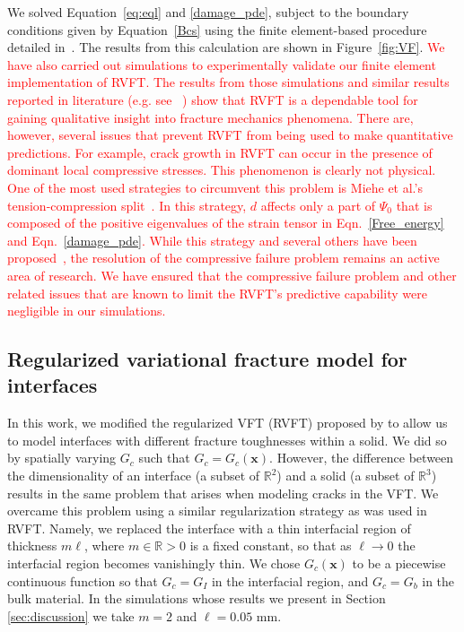 \documentclass[12pt,onecolumn]{article}
\newcommand{\bs}[1]{\ensuremath{\mathbf{#1}}}
\begin{document}
\begin{bibunit}
We solved Equation~\eqref{eq:eql} and \eqref{damage_pde}, subject to the boundary conditions given by Equation~\eqref{Bcs} using the finite element-based procedure detailed in~\cite{miehe_2010}. The results from this calculation  are shown in Figure~\ref{fig:VF}. \textcolor{red}{We have also carried out simulations to experimentally validate our finite element implementation of RVFT. The results from those simulations and similar results reported in literature (e.g. see ~\cite{mesgarnejad2015validation,miehe2010phase,wu2017phase}) show that  RVFT is a dependable tool for gaining qualitative insight into fracture mechanics phenomena. There are, however, several issues that prevent RVFT from being used to make quantitative predictions. For example, crack growth in RVFT can occur in the presence of dominant local compressive stresses. This phenomenon is clearly not physical. One of the most used strategies to circumvent this problem is Miehe et al.'s  tension-compression split~\cite{miehe2010phase}. In this strategy, $d$ affects only a part of $\Psi_0$ that is composed of the positive eigenvalues of the strain tensor in Eqn.~\eqref{Free_energy} and Eqn.~\eqref{damage_pde}. While this strategy and several others have been proposed~\cite{amor2009regularized,li2016gradient,strobl2016constitutive}, the resolution of the compressive failure problem remains an active area of research. We have ensured that the compressive failure problem and other related issues that are known to limit the RVFT's predictive capability were negligible in our simulations.}

\subsection{Regularized variational fracture model for interfaces}
In this work, we modified the regularized VFT (RVFT) proposed by \cite{bourdin2000numerical} to allow us to model interfaces with different fracture toughnesses within a solid. We did so by spatially varying $G_c$ such that $G_c = G_c(\bs{x})$. However, the difference between the dimensionality of an interface (a subset of $\mathbb{R}^2$) and a solid (a subset of $\mathbb{R}^3$) results in the same problem that arises when modeling cracks in the VFT. We overcame this problem using a similar regularization strategy as was used in RVFT. Namely, we replaced the interface with a thin interfacial region of thickness $m \ell$, where $m\in\mathbb{R}>0$ is a fixed constant, so that as $\ell \to 0$ the interfacial region becomes vanishingly thin. We chose $G_c(\bs{x})$ to be a piecewise continuous function so that $G_c = G_I$ in the interfacial region, and $G_c = G_b$ in the bulk material.  In the simulations whose results we present in Section \ref{sec:discussion} we take $m=2$ and $\ell=0.05$ mm.


\end{bibunit}
\end{document}

